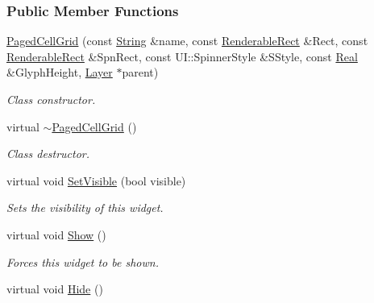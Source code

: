 \subsubsection*{Public Member Functions}
\begin{DoxyCompactItemize}
\item 
\hyperlink{classphys_1_1UI_1_1PagedCellGrid_a3038df62663e3ee8b860bd6f035af732}{PagedCellGrid} (const \hyperlink{namespacephys_aa03900411993de7fbfec4789bc1d392e}{String} \&name, const \hyperlink{structphys_1_1UI_1_1RenderableRect}{RenderableRect} \&Rect, const \hyperlink{structphys_1_1UI_1_1RenderableRect}{RenderableRect} \&SpnRect, const UI::SpinnerStyle \&SStyle, const \hyperlink{namespacephys_af7eb897198d265b8e868f45240230d5f}{Real} \&GlyphHeight, \hyperlink{classphys_1_1UI_1_1Layer}{Layer} $\ast$parent)
\begin{DoxyCompactList}\small\item\em Class constructor. \item\end{DoxyCompactList}\item 
\hypertarget{classphys_1_1UI_1_1PagedCellGrid_a6b9c8876b41321b77321efcf27feb2c6}{
virtual \hyperlink{classphys_1_1UI_1_1PagedCellGrid_a6b9c8876b41321b77321efcf27feb2c6}{$\sim$PagedCellGrid} ()}
\label{classphys_1_1UI_1_1PagedCellGrid_a6b9c8876b41321b77321efcf27feb2c6}

\begin{DoxyCompactList}\small\item\em Class destructor. \item\end{DoxyCompactList}\item 
virtual void \hyperlink{classphys_1_1UI_1_1PagedCellGrid_a76ff4b649f4687203ba9d1473474ce99}{SetVisible} (bool visible)
\begin{DoxyCompactList}\small\item\em Sets the visibility of this widget. \item\end{DoxyCompactList}\item 
\hypertarget{classphys_1_1UI_1_1PagedCellGrid_aae7ae6fbe4d0fc1006c6abd8d1f22727}{
virtual void \hyperlink{classphys_1_1UI_1_1PagedCellGrid_aae7ae6fbe4d0fc1006c6abd8d1f22727}{Show} ()}
\label{classphys_1_1UI_1_1PagedCellGrid_aae7ae6fbe4d0fc1006c6abd8d1f22727}

\begin{DoxyCompactList}\small\item\em Forces this widget to be shown. \item\end{DoxyCompactList}\item 
\hypertarget{classphys_1_1UI_1_1PagedCellGrid_ae4cbcf05df48dfcb0871f4d3604010ec}{
virtual void \hyperlink{classphys_1_1UI_1_1PagedCellGrid_ae4cbcf05df48dfcb0871f4d3604010ec}{Hide} ()}
\label{classphys_1_1UI_1_1PagedCellGrid_ae4cbcf05df48dfcb0871f4d3604010ec}


\end{DoxyCompactItemize}
